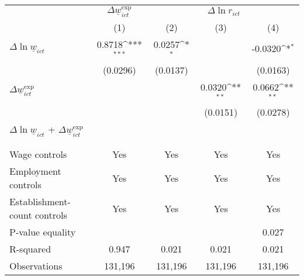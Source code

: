 {
\def\sym#1{\ifmmode^{#1}\else\(^{#1}\)\fi}
\begin{tabular}{l*{4}{c}}
\hline\hline
          &\multicolumn{1}{c}{$\Delta \underline{w}_{ict}^{\text{exp}}$}&\multicolumn{3}{c}{$\Delta \ln r_{ict}$}                \\\cmidrule(lr){2-2}\cmidrule(lr){3-5}
          &\multicolumn{1}{c}{(1)}         &\multicolumn{1}{c}{(2)}         &\multicolumn{1}{c}{(3)}         &\multicolumn{1}{c}{(4)}         \\
\hline
$\Delta \ln \underline{w}_{ict}$&   0.8718\sym{***}&   0.0257\sym{*}  &                  &  -0.0320\sym{*}  \\
          & (0.0296)         & (0.0137)         &                  & (0.0163)         \\
[1em]
$\Delta \underline{w}_{ict}^{\text{exp}}$&                  &                  &   0.0320\sym{**} &   0.0662\sym{**} \\
          &                  &                  & (0.0151)         & (0.0278)         \\
\hline
$\Delta \ln \underline{w}_{ict}$ + $\Delta \underline{w}_{ict}^{\text{exp}}$&                  &                  &                  &                  \\
          &                  &                  &                  &                  \\
\vspace{-2mm}&                  &                  &                  &                  \\
Wage controls&      Yes         &      Yes         &      Yes         &      Yes         \\
Employment controls&      Yes         &      Yes         &      Yes         &      Yes         \\
Establishment-count controls&      Yes         &      Yes         &      Yes         &      Yes         \\
P-value equality&                  &                  &                  &    0.027         \\
R-squared &    0.947         &    0.021         &    0.021         &    0.021         \\
Observations&  131,196         &  131,196         &  131,196         &  131,196         \\
\hline\hline
\end{tabular}
}
